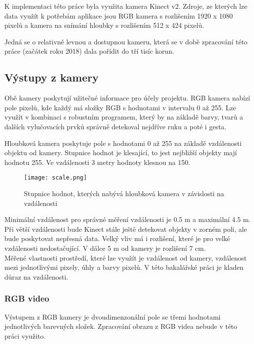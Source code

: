 K implementaci této práce byla využita kamera Kinect v2. Zdroje, ze kterých lze data využít k potřebám aplikace jsou RGB kamera s rozlišením 1920 x 1080 pixelů a kamera na snímání hloubky s rozlišením 512 x 424 pixelů.

Jedná se o relativně levnou a dostupnou kameru, která se v době zpracování této práce (začátek roku 2018) dala pořídit do tří tisíc korun.

\subsection{Výstupy z kamery}

Obě kamery poskytují užitečné informace pro účely projektu. RGB kamera nabízí pole pixelů, kde každý má složky RGB s hodnotami v intervalu 0 až 255. Lze využít v kombinaci s robustním programem, který by na základě barvy, tvarů a dalších vylučovacích prvků správně detekoval nejdříve ruku a poté i gesta. %

Hloubková kamera poskytuje pole s hodnotami 0 až 255 na základě vzdálenosti objektu od kamery. Stupnice hodnot je klesající, to jest nejbližší objekty mají hodnotu 255. Ve vzdálenosti 3 metry hodnoty klesnou na 150. 

\begin{figure}[htp]
\centering
\texttt{[image: scale.png]}
\caption{Stupnice hodnot, kterých nabývá hloubková kamera v závislosti na vzdálenosti}
\label{fig:scale}
\label{pic9}
\end{figure}

Minimální vzdálenost pro správné měření vzdálenosti je 0.5 m a maximální 4.5 m. Při větší vzdálenosti bude Kinect stále ještě detekovat objekty v zorném poli, ale bude poskytovat nepřesná data. Velký vliv má i rozlišení, které je pro velké vzdálenosti nedostačující. V dálce 5 m od kamery je rozlišení 7 cm.\\

Měřené vlastnosti prostředí, které lze využít je vzdálenost od kamery, vzdálenost mezi jednotlivými pixely, úhly a barvy pixelů. V této bakalářské práci je kladen důraz na vzdálenosti.

\subsubsection{RGB video}
Výstupem z RGB kamery je dvoudimenzonální pole se třemi hodnotami jednotlivých barevných složek. Zpracování obrazu z RGB videa nebude v této práci využito. \\

